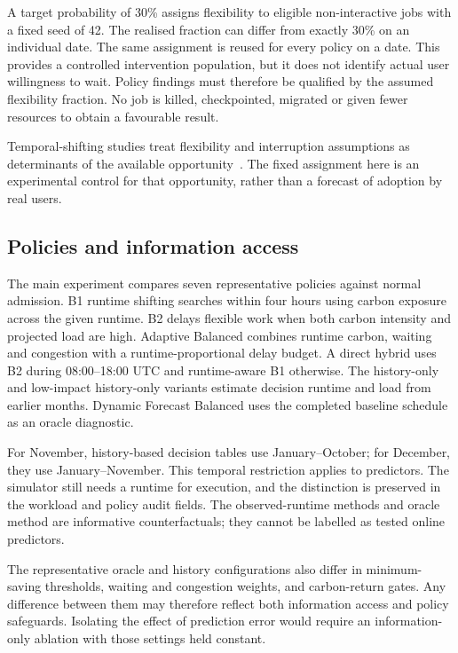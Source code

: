A target probability of 30\% assigns flexibility to eligible non-interactive jobs with a fixed seed of 42. The realised fraction can differ from exactly 30\% on an individual date. The same assignment is reused for every policy on a date. This provides a controlled intervention population, but it does not identify actual user willingness to wait. Policy findings must therefore be qualified by the assumed flexibility fraction. No job is killed, checkpointed, migrated or given fewer resources to obtain a favourable result.

Temporal-shifting studies treat flexibility and interruption assumptions as determinants of the available opportunity~\cite{wiesner2021wait,sukprasert2024limitations}. The fixed assignment here is an experimental control for that opportunity, rather than a forecast of adoption by real users.

\subsection{Policies and information access}
The main experiment compares seven representative policies against normal admission. B1 runtime shifting searches within four hours using carbon exposure across the given runtime. B2 delays flexible work when both carbon intensity and projected load are high. Adaptive Balanced combines runtime carbon, waiting and congestion with a runtime-proportional delay budget. A direct hybrid uses B2 during 08:00--18:00 UTC and runtime-aware B1 otherwise. The history-only and low-impact history-only variants estimate decision runtime and load from earlier months. Dynamic Forecast Balanced uses the completed baseline schedule as an oracle diagnostic.

For November, history-based decision tables use January--October; for December, they use January--November. This temporal restriction applies to predictors. The simulator still needs a runtime for execution, and the distinction is preserved in the workload and policy audit fields. The observed-runtime methods and oracle method are informative counterfactuals; they cannot be labelled as tested online predictors.

The representative oracle and history configurations also differ in minimum-saving thresholds, waiting and congestion weights, and carbon-return gates. Any difference between them may therefore reflect both information access and policy safeguards. Isolating the effect of prediction error would require an information-only ablation with those settings held constant.

